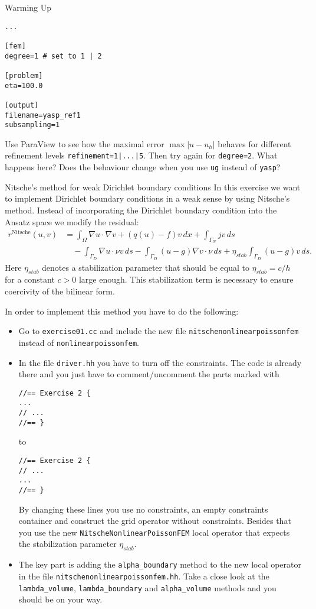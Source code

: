 \documentclass[12pt,a4paper]{article}
\begin{document}
\begin{Exercise}{Warming Up}
\begin{enumerate}
\begin{lstlisting}
...

[fem]
degree=1 # set to 1 | 2

[problem]
eta=100.0

[output]
filename=yasp_ref1
subsampling=1
    \end{lstlisting}
    Use ParaView to see how the maximal error $\max|u-u_h|$ behaves
    for different refinement levels \lstinline{refinement=1|...|5}.
    Then try again for \lstinline{degree=2}.  What happens here?  Does
    the behaviour change when you use \lstinline{ug} instead of
    \lstinline{yasp}?
  \end{enumerate}
\end{Exercise}

\begin{Exercise}{Nitsche's method for weak Dirichlet boundary
    conditions}
  In this exercise we want to implement Dirichlet boundary conditions
  in a weak sense by using Nitsche's method.  Instead of
  incorporating the Dirichlet boundary condition into the Ansatz space
  we modify the residual:
  \begin{align*}
    r^{\text{Nitsche}}(u,v) &= \int_\Omega \nabla u \cdot \nabla v + (q(u)-f)v\,dx + \int_{\Gamma_N} jv\,ds \\
    &\quad - \int_{\Gamma_D} \nabla u \cdot\nu v\,ds - \int_{\Gamma_D} (u-g)\nabla v \cdot\nu\,ds
    + \eta_{stab} \int_{\Gamma_D} (u-g)v\,ds.
  \end{align*}
  Here $\eta_{stab}$ denotes a stabilization parameter that should be
  equal to $\eta_{stab}=c/h$ for a constant $c>0$ large enough.  This
  stabilization term is necessary to ensure coercivity of the bilinear
  form.

  In order to implement this method you have to do the following:
  \begin{itemize}
  \item Go to \lstinline{exercise01.cc} and include the new file
    \lstinline{nitschenonlinearpoissonfem} instead of
    \lstinline{nonlinearpoissonfem}.
  \item In the file \lstinline{driver.hh} you have to turn off the
    constraints. The code is already there and you just have to
    comment/uncomment the parts marked with
    \begin{lstlisting}
//== Exercise 2 {
...
// ...
//== }
    \end{lstlisting}
    to
    \begin{lstlisting}
//== Exercise 2 {
// ...
...
//== }
    \end{lstlisting}
    By changing these lines you use no constraints, an empty
    constraints container and construct the grid operator without
    constraints.  Besides that you use the new
    \lstinline{NitscheNonlinearPoissonFEM} local operator that expects
    the stabilization parameter $\eta_{stab}$.
  \item The key part is adding the \lstinline{alpha_boundary} method
    to the new local operator in the file
    \lstinline{nitschenonlinearpoissonfem.hh}.  Take a close look at
    the \lstinline{lambda_volume}, \lstinline{lambda_boundary} and
    \lstinline{alpha_volume} methods and you should be on your way.


\end{itemize}
\end{Exercise}
\end{document}
